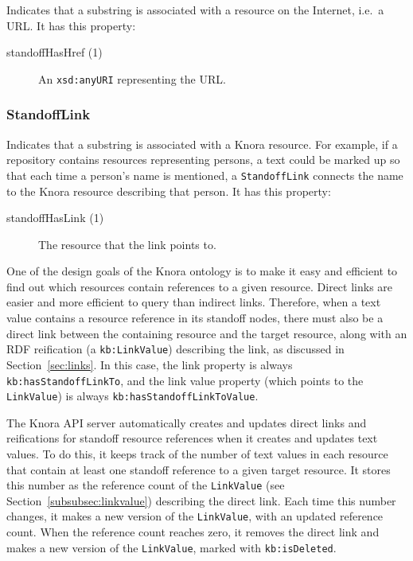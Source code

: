 \documentclass[12pt, a4paper]{article}
\begin{document}
Indicates that a substring is associated with a resource on the Internet, i.e.\ a URL. It has this property:

\begin{description}
	\item[standoffHasHref (1)] An \texttt{xsd:anyURI} representing the URL.
\end{description}

\subsubsection{StandoffLink}

\label{subsubsec:standoff-link}

Indicates that a substring is associated with a Knora resource. For example, if a repository contains resources representing persons, a text could be marked up so that each time a person's name is mentioned, a \texttt{StandoffLink} connects the name to the Knora resource describing that person. It has this property:

\begin{description}
	\item[standoffHasLink (1)] The resource that the link points to.
\end{description}

One of the design goals of the Knora ontology is to make it easy and efficient to find out which resources contain references to a given resource. Direct links are easier and more efficient to query than indirect links. Therefore, when a text value contains a resource reference in its standoff nodes, there must also be a direct link between the containing resource and the target resource, along with an RDF reification (a \texttt{kb:LinkValue}) describing the link, as discussed in Section~\ref{sec:links}. In this case, the link property is always \texttt{kb:hasStandoffLinkTo}, and the link value property (which points to the \texttt{LinkValue}) is always \texttt{kb:hasStandoffLinkToValue}.

The Knora API server automatically creates and updates direct links and reifications for standoff resource references when it creates and updates text values. To do this, it keeps track of the number of text values in each resource that contain at least one standoff reference to a given target resource. It stores this number as the reference count of the \texttt{LinkValue} (see Section~\ref{subsubsec:linkvalue}) describing the direct link. Each time this number changes, it makes a new version of the \texttt{LinkValue}, with an updated reference count. When the reference count reaches zero, it removes the direct link and makes a new version of the \texttt{LinkValue}, marked with \texttt{kb:isDeleted}.
\end{document}
